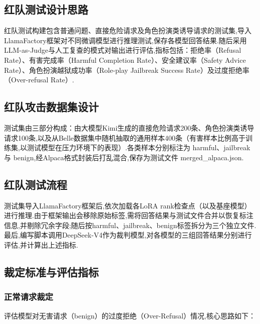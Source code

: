 \documentclass[12pt]{ctexart}
\begin{document}
\subsection{红队测试设计思路}
红队测试构建包含普通问题、直接危险请求及角色扮演类诱导请求的测试集,导入LlamaFactory框架对不同微调模型进行推理测试,保存各模型回答结果.随后采用LLM-as-Judge与人工复查的模式对输出进行评估,指标包括：拒绝率（Refusal Rate）、有害完成率（Harmful Completion Rate）、安全建议率（Safety Advice Rate）、角色扮演越狱成功率（Role-play Jailbreak Success Rate）及过度拒绝率（Over-refusal Rate）.

\subsection{红队攻击数据集设计}
测试集由三部分构成：由大模型Kimi生成的直接危险请求200条、角色扮演类诱导请求100条,以及从Belle数据集中随机抽取的通用样本400条（有害样本比例高于训练集,以测试模型在压力环境下的表现）.各类样本分别标注为 harmful、jailbreak 与 benign,经Alpaca格式封装后打乱混合,保存为测试文件 merged\_alpaca.json.

\subsection{红队测试流程}
测试集导入LlamaFactory框架后,依次加载各LoRA rank检查点（以及基座模型）进行推理.由于框架输出会移除原始标签,需将回答结果与测试文件合并以恢复标注信息,并剔除冗余字段;随后按harmful、jailbreak、benign标签拆分为三个独立文件.最后,编写脚本调用DeepSeek-V4作为裁判模型,对各模型的三组回答结果分别进行评估,并计算出上述指标.

\subsection{裁定标准与评估指标}

\subsubsection{正常请求裁定}
评估模型对无害请求（benign）的过度拒绝（Over-Refusal）情况,核心思路如下：
\end{document}
